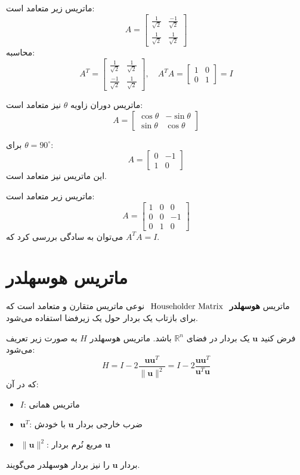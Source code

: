 \begin{example}
	ماتریس زیر متعامد است:
	\[
	A = \begin{bmatrix}
		\frac{1}{\sqrt{2}} & \frac{-1}{\sqrt{2}} \\
		\frac{1}{\sqrt{2}} & \frac{1}{\sqrt{2}}
	\end{bmatrix}
	\]
	محاسبه:
	\[
	A^T = \begin{bmatrix}
		\frac{1}{\sqrt{2}} & \frac{1}{\sqrt{2}} \\
		\frac{-1}{\sqrt{2}} & \frac{1}{\sqrt{2}}
	\end{bmatrix}, \quad
	A^T A = \begin{bmatrix}
		1 & 0 \\
		0 & 1
	\end{bmatrix} = I
	\]
\end{example}
\begin{example}
	ماتریس دوران زاویه \( \theta \) نیز متعامد است:
	\[
	A = \begin{bmatrix}
		\cos\theta & -\sin\theta \\
		\sin\theta & \cos\theta
	\end{bmatrix}
	\]
	
	برای \( \theta = 90^\circ \):
	\[
	A = \begin{bmatrix}
		0 & -1 \\
		1 & 0
	\end{bmatrix}
	\]
	این ماتریس نیز متعامد است.
\end{example}
\begin{example}
	ماتریس زیر متعامد است:
	\[
	A = \begin{bmatrix}
		1 & 0 & 0 \\
		0 & 0 & -1 \\
		0 & 1 & 0
	\end{bmatrix}
	\]
	می‌توان به سادگی بررسی کرد که \( A^T A = I \).
\end{example}
\section{ماتریس هوسهلدر}



ماتریس \textbf{هوسهلدر} 
${~\rm Householder ~Matrix~}$
نوعی ماتریس متقارن و متعامد است که برای بازتاب یک بردار حول یک زیرفضا استفاده می‌شود.

\begin{definition}
	فرض کنید \( \mathbf{u} \) یک بردار در فضای \( \mathbb{R}^n \) باشد. ماتریس هوسهلدر \( H \) به صورت زیر تعریف می‌شود:
	\[
	H = I - 2\frac{\mathbf{u}\mathbf{u}^T}{\|\mathbf{u}\|^2}=I - 2\frac{\mathbf{u}\mathbf{u}^T}{\mathbf{u}^T\mathbf{u}}
	\]
	که در آن:
	\begin{itemize}
		\item \( I \): ماتریس همانی
		\item \( \mathbf{u}^T \): ضرب خارجی بردار \( \mathbf{u} \) با خودش
		\item \( \|\mathbf{u}\|^2 \): مربع نُرم بردار \( \mathbf{u} \)
	\end{itemize}
	بردار 
	$\mathbf{u}$
	را نیز بردار هوسهلدر می‌گویند.
\end{definition}
